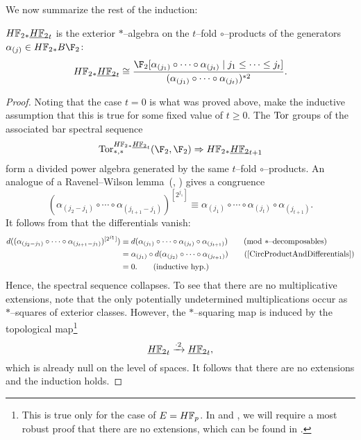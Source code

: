We now summarize the rest of the induction:
\begin{theorem}\label{UnstableSteenrodInduction}
\(\HFtwo_* \OS{\HFtwo}{t}\) is the exterior \(\ast\)--algebra on the \(t\)--fold \(\circ\)--products of the generators \(\alpha_{(j)} \in \HFtwo_* B\F_2\): \[\HFtwo_* \OS{\HFtwo}{t} \cong \frac{\F_2[\alpha_{(j_1)} \circ \cdots \circ \alpha_{(j_t)} \mid j_1 \le \cdots \le j_t]}{(\alpha_{(j_1)} \circ \cdots \circ \alpha_{(j_t)})^{\ast 2}}.\]
\end{theorem}
\begin{proof}
Noting that the case \(t = 0\) is what was proved above, make the inductive assumption that this is true for some fixed value of \(t \ge 0\).  The \(\operatorname{Tor}\) groups of the associated bar spectral sequence \[\Tor^{\HFtwo_* \OS{\HFtwo}{t}}_{*, *}(\F_2, \F_2) \Rightarrow \HFtwo_* \OS{\HFtwo}{t+1}\] form a divided power algebra generated by the same \(t\)--fold \(\circ\)--products.  An analogue of a Ravenel--Wilson lemma~(\cite[Lemma 9.5]{RavenelWilsonKthyOfEMSpaces}, \cite[Claim 8.16]{Wilson}) gives a congruence \[(\alpha_{(j_2-j_1)} \circ \cdots \circ \alpha_{(j_{t+1}-j_1)})^{[2^{j_1}]} \equiv \alpha_{(j_1)} \circ \cdots \circ \alpha_{(j_t)} \circ \alpha_{(j_{t+1})} \tag{mod \(\ast\)--decomposables}.\]  It follows from  that the differentials vanish:
\begin{align*}
d((\alpha_{(j_2-j_1)} \circ \cdots \circ \alpha_{(j_{t+1}-j_1)})^{[2^{j_1}]}) & \equiv d(\alpha_{(j_1)} \circ \cdots \circ \alpha_{(j_t)} \circ \alpha_{(j_{t+1})}) \tag{mod \(\ast\)--decomposables} \\
& = \alpha_{(j_1)} \circ d(\alpha_{(j_2)} \circ \cdots \circ \alpha_{(j_{t+1})}) \tag{\Cref{CircProductAndDifferentials}} \\
& = 0. \tag{inductive hyp.}
\end{align*}
Hence, the spectral sequence collapses.  To see that there are no multiplicative extensions, note that the only potentially undetermined multiplications occur as \(\ast\)--squares of exterior classes.  However, the \(\ast\)--squaring map is induced by the topological map\footnote{This is true only for the case of \(E = \HFp\).  In  and , we will require a most robust proof that there are no extensions, which can be found in \cite[Proof of 8.11]{Wilson}.} \[\OS{\HFtwo}{t} \xrightarrow{\cdot 2} \OS{\HFtwo}{t},\] which is already null on the level of spaces.  It follows that there are no extensions and the induction holds.
\end{proof}

